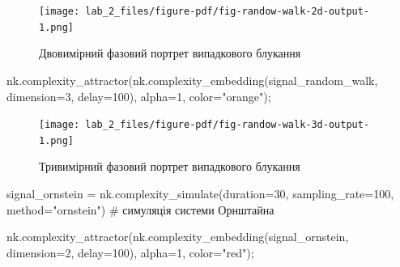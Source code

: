 \documentclass[
  letterpaper,
]{report}
\newenvironment{Shaded}{\begin{snugshade}}{\end{snugshade}}
\newcommand{\CommentTok}[1]{\textcolor[rgb]{0.37,0.37,0.37}{#1}}
\newcommand{\DecValTok}[1]{\textcolor[rgb]{0.68,0.00,0.00}{#1}}
\newcommand{\NormalTok}[1]{\textcolor[rgb]{0.00,0.23,0.31}{#1}}
\newcommand{\OperatorTok}[1]{\textcolor[rgb]{0.37,0.37,0.37}{#1}}
\newcommand{\StringTok}[1]{\textcolor[rgb]{0.13,0.47,0.30}{#1}}
\begin{document}
\begin{figure}[H]

{\centering \texttt{[image: lab\_2\_files/figure-pdf/fig-randow-walk-2d-output-1.png]}

}

\caption{\label{fig-randow-walk-2d}Двовимірний фазовий портрет
випадкового блукання}

\end{figure}

\begin{Shaded}
\begin{Highlighting}[]
\NormalTok{nk.complexity\_attractor(nk.complexity\_embedding(signal\_random\_walk, dimension}\OperatorTok{=}\DecValTok{3}\NormalTok{, delay}\OperatorTok{=}\DecValTok{100}\NormalTok{), }
\NormalTok{                        alpha}\OperatorTok{=}\DecValTok{1}\NormalTok{, }
\NormalTok{                        color}\OperatorTok{=}\StringTok{"orange"}\NormalTok{)}\OperatorTok{;}
\end{Highlighting}
\end{Shaded}

\begin{figure}[H]

{\centering \texttt{[image: lab\_2\_files/figure-pdf/fig-randow-walk-3d-output-1.png]}

}

\caption{\label{fig-randow-walk-3d}Тривимірний фазовий портрет
випадкового блукання}

\end{figure}

\begin{Shaded}
\begin{Highlighting}[]
\NormalTok{signal\_ornstein }\OperatorTok{=}\NormalTok{ nk.complexity\_simulate(duration}\OperatorTok{=}\DecValTok{30}\NormalTok{, }
\NormalTok{                                        sampling\_rate}\OperatorTok{=}\DecValTok{100}\NormalTok{, }
\NormalTok{                                        method}\OperatorTok{=}\StringTok{"ornstein"}\NormalTok{) }\CommentTok{\# симуляція системи Орнштайна}
\end{Highlighting}
\end{Shaded}

\begin{Shaded}
\begin{Highlighting}[]
\NormalTok{nk.complexity\_attractor(nk.complexity\_embedding(signal\_ornstein, dimension}\OperatorTok{=}\DecValTok{2}\NormalTok{, delay}\OperatorTok{=}\DecValTok{100}\NormalTok{), }
\NormalTok{                        alpha}\OperatorTok{=}\DecValTok{1}\NormalTok{, }
\NormalTok{                        color}\OperatorTok{=}\StringTok{"red"}\NormalTok{)}\OperatorTok{;} 
\end{Highlighting}
\end{Shaded}
\end{document}
